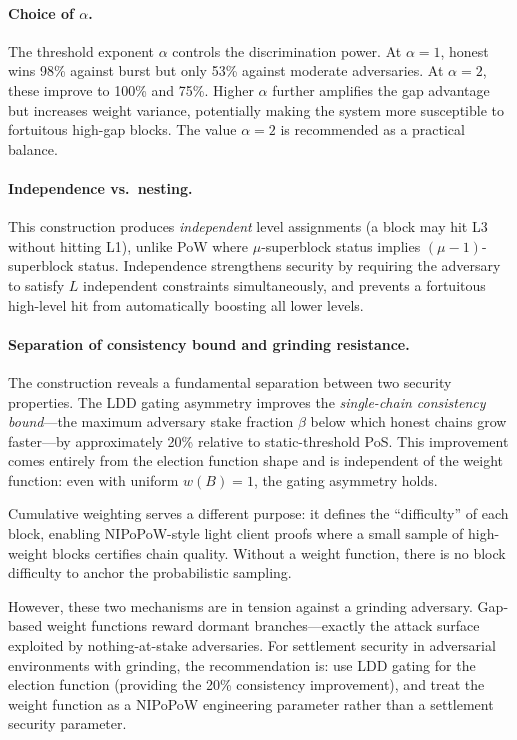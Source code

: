 \documentclass[11pt]{article}
\begin{document}
\paragraph{Choice of $\alpha$.} The threshold exponent $\alpha$ controls the discrimination power. At $\alpha = 1$, honest wins 98\% against burst but only 53\% against moderate adversaries. At $\alpha = 2$, these improve to 100\% and 75\%. Higher $\alpha$ further amplifies the gap advantage but increases weight variance, potentially making the system more susceptible to fortuitous high-gap blocks. The value $\alpha = 2$ is recommended as a practical balance.

\paragraph{Independence vs.\ nesting.} This construction produces \emph{independent} level assignments (a block may hit L3 without hitting L1), unlike PoW where $\mu$-superblock status implies $(\mu-1)$-superblock status. Independence strengthens security by requiring the adversary to satisfy $L$ independent constraints simultaneously, and prevents a fortuitous high-level hit from automatically boosting all lower levels.

\paragraph{Separation of consistency bound and grinding resistance.}
The construction reveals a fundamental separation between two security properties. The LDD gating asymmetry improves the \emph{single-chain consistency bound}---the maximum adversary stake fraction $\beta$ below which honest chains grow faster---by approximately 20\% relative to static-threshold PoS. This improvement comes entirely from the election function shape and is independent of the weight function: even with uniform $w(B) = 1$, the gating asymmetry holds.

Cumulative weighting serves a different purpose: it defines the ``difficulty'' of each block, enabling NIPoPoW-style light client proofs where a small sample of high-weight blocks certifies chain quality. Without a weight function, there is no block difficulty to anchor the probabilistic sampling.

However, these two mechanisms are in tension against a grinding adversary. Gap-based weight functions reward dormant branches---exactly the attack surface exploited by nothing-at-stake adversaries. For settlement security in adversarial environments with grinding, the recommendation is: use LDD gating for the election function (providing the 20\% consistency improvement), and treat the weight function as a NIPoPoW engineering parameter rather than a settlement security parameter.
\end{document}
